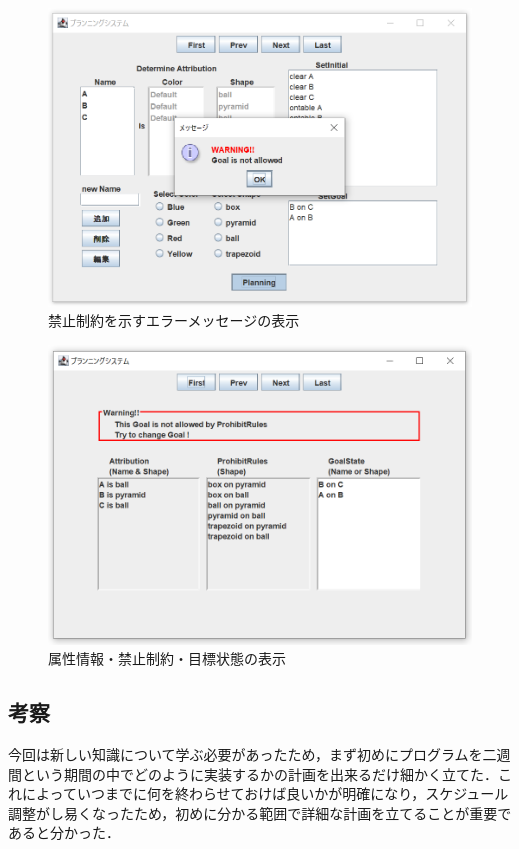 \documentclass[uplatex,12pt]{jsarticle}
\begin{document}
\begin{figure}[htbp]
  \begin{center}
    \includegraphics[scale=0.6]{images/prohibit1.PNG}
    \caption{禁止制約を示すエラーメッセージの表示}
    \label{fig:prohibit1}
  \end{center}
\end{figure}
\begin{figure}[htbp]
  \begin{center}
    \includegraphics[scale=0.6]{images/prohibit2.PNG}
    \caption{属性情報・禁止制約・目標状態の表示}
    \label{fig:prohibit2}
  \end{center}
\end{figure}

\clearpage
\subsection{考察}
今回は新しい知識について学ぶ必要があったため，まず初めにプログラムを二週間という期間の中でどのように実装するかの計画を出来るだけ細かく立てた．これによっていつまでに何を終わらせておけば良いかが明確になり，スケジュール調整がし易くなったため，初めに分かる範囲で詳細な計画を立てることが重要であると分かった．\\
\end{document}
